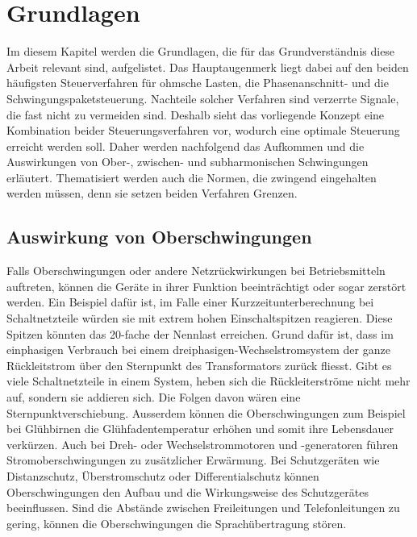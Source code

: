 

\section{Grundlagen}
Im diesem Kapitel werden die Grundlagen, die für das Grundverständnis diese Arbeit relevant sind, aufgelistet. Das Hauptaugenmerk liegt dabei auf den beiden häufigsten Steuerverfahren für ohmsche Lasten, die Phasenanschnitt- und die Schwingungspaketsteuerung. Nachteile solcher Verfahren sind verzerrte Signale, die fast nicht zu vermeiden sind. Deshalb sieht das vorliegende Konzept eine Kombination beider Steuerungsverfahren vor, wodurch eine optimale Steuerung erreicht werden soll. Daher werden nachfolgend das Aufkommen und die Auswirkungen von Ober-, zwischen- und subharmonischen Schwingungen erläutert. Thematisiert werden auch die Normen, die zwingend eingehalten werden müssen, denn sie setzen beiden Verfahren Grenzen.

\subsection{Auswirkung von Oberschwingungen}

Falls Oberschwingungen oder andere Netzrückwirkungen bei Betriebsmitteln auftreten, können die Geräte in ihrer Funktion beeinträchtigt oder sogar zerstört werden. Ein Beispiel dafür ist, im Falle einer Kurzzeitunterberechnung bei Schaltnetzteile würden sie mit extrem hohen Einschaltspitzen reagieren. Diese Spitzen könnten das 20-fache der Nennlast erreichen. Grund dafür ist, dass im einphasigen Verbrauch bei einem dreiphasigen-Wechselstromsystem der ganze Rückleitstrom über den Sternpunkt des Transformators zurück fliesst. Gibt es viele Schaltnetzteile in einem System, heben sich die Rückleiterströme nicht mehr auf, sondern sie addieren sich. Die Folgen davon wären eine Sternpunktverschiebung. Ausserdem können die Oberschwingungen zum Beispiel bei Glühbirnen die Glühfadentemperatur erhöhen und somit ihre Lebensdauer verkürzen. Auch bei Dreh- oder Wechselstrommotoren und -generatoren führen Stromoberschwingungen zu zusätzlicher Erwärmung. Bei Schutzgeräten wie Distanzschutz, Überstromschutz oder Differentialschutz können Oberschwingungen den Aufbau und die Wirkungsweise des Schutzgerätes beeinflussen. Sind die Abstände zwischen Freileitungen und Telefonleitungen zu gering, können die Oberschwingungen die Sprachübertragung stören.



